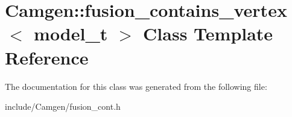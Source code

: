 \hypertarget{a00236}{\section{Camgen\-:\-:fusion\-\_\-contains\-\_\-vertex$<$ model\-\_\-t $>$ Class Template Reference}
\label{a00236}
}


The documentation for this class was generated from the following file\-:\begin{DoxyCompactItemize}
\item 
include/\-Camgen/fusion\-\_\-cont.\-h\end{DoxyCompactItemize}

